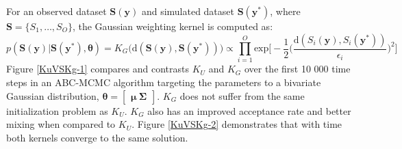 
For an observed dataset $\bm{S}(\bm{y})$ and simulated dataset $\bm{S}(\bm{y^*})$, where $\bm{S} = \{S_1,\dots,S_O\}$, the Gaussian weighting kernel is computed as:
\begin{equation}
p(\bm{S}(\bm{y})|\bm{S}(\bm{y^*}),\bm{\theta}) = K_G\big(\text{d}(\bm{S}(\bm{y}),\bm{S}(\bm{y^*}))\big) \propto \prod_{i = 1}^{O} \text{exp}\Big[-\frac{1}{2}\Big(\frac{\text{d}(S_i(\bm{y}),S_i(\bm{y^*}))}{\epsilon_i}\Big)^2\Big]
\end{equation}
Figure \ref{KuVSKg-1} compares and contrasts $K_U$ and $K_G$ over the first 10 000 time steps in an ABC-MCMC algorithm targeting the parameters to a bivariate Gaussian distribution, $\bm{\theta} = \begin{bmatrix}
\bm{\mu}\ \bm{\Sigma}
\end{bmatrix}$. $K_G$ does not suffer from the same initialization problem as $K_U$. $K_G$ also has an improved acceptance rate and better mixing when compared to $K_U$. Figure \ref{KuVSKg-2} demonstrates that with time both kernels converge to the same solution.\par

